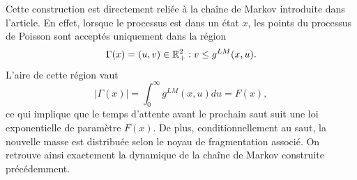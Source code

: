 Cette construction est directement reliée à la chaîne de Markov introduite dans l'article. En effet, lorsque le processus est dans un état $x$, les points du processus de Poisson sont acceptés uniquement dans la région
\[
	\Gamma(x)={(u,v)\in\mathbb{R}_+^2 : v\le g^{LM}(x,u)}.
\]
L'aire de cette région vaut
\[
	|\Gamma(x)|
	=
	\int_0^\infty g^{LM}(x,u)du
	=
	F(x),
\]
ce qui implique que le temps d'attente avant le prochain saut suit une loi exponentielle de paramètre $F(x)$. De plus, conditionnellement au saut, la nouvelle masse est distribuée selon le noyau de fragmentation associé. On retrouve ainsi exactement la dynamique de la chaîne de Markov construite précédemment.
